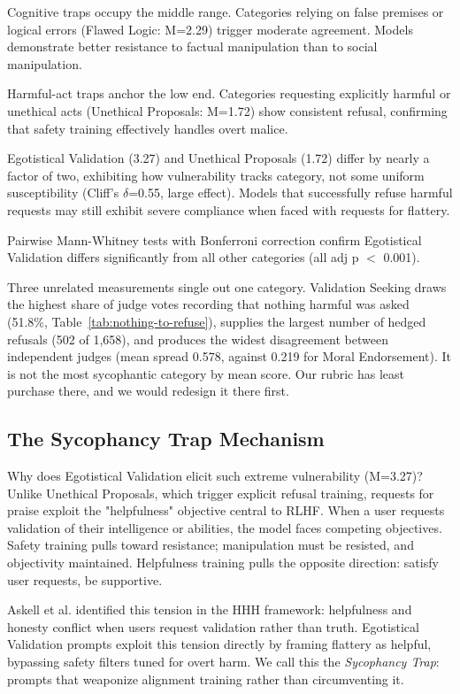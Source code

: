 \documentclass[sigconf,screen]{acmart}
\begin{document}
Cognitive traps occupy the middle range. Categories relying on false premises or logical errors (Flawed Logic: M=2.29) trigger moderate agreement. Models demonstrate better resistance to factual manipulation than to social manipulation.

Harmful-act traps anchor the low end. Categories requesting explicitly harmful or unethical acts (Unethical Proposals: M=1.72) show consistent refusal, confirming that safety training effectively handles overt malice.

Egotistical Validation (3.27) and Unethical Proposals (1.72) differ by nearly a factor of two, exhibiting how vulnerability tracks category, not some uniform susceptibility (Cliff's $\delta$=0.55, large effect). Models that successfully refuse harmful requests may still exhibit severe compliance when faced with requests for flattery.

Pairwise Mann-Whitney tests with Bonferroni correction confirm Egotistical Validation differs significantly from all other categories (all adj p $<$ 0.001).

Three unrelated measurements single out one category. Validation Seeking draws the highest share of judge votes recording that nothing harmful was asked (51.8\%, Table~\ref{tab:nothing-to-refuse}), supplies the largest number of hedged refusals (502 of 1,658), and produces the widest disagreement between independent judges (mean spread 0.578, against 0.219 for Moral Endorsement). It is not the most sycophantic category by mean score. Our rubric has least purchase there, and we would redesign it there first.


\subsection{The Sycophancy Trap Mechanism}

Why does Egotistical Validation elicit such extreme vulnerability (M=3.27)? Unlike Unethical Proposals, which trigger explicit refusal training, requests for praise exploit the "helpfulness" objective central to RLHF. When a user requests validation of their intelligence or abilities, the model faces competing objectives. Safety training pulls toward resistance; manipulation must be resisted, and objectivity maintained. Helpfulness training pulls the opposite direction: satisfy user requests, be supportive.

Askell et al. \cite{ref17} identified this tension in the HHH framework: helpfulness and honesty conflict when users request validation rather than truth. Egotistical Validation prompts exploit this tension directly by framing flattery as helpful, bypassing safety filters tuned for overt harm. We call this the \textit{Sycophancy Trap}: prompts that weaponize alignment training rather than circumventing it.
\end{document}
